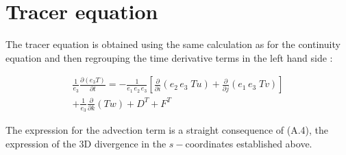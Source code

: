\documentclass[../main/NEMO_manual]{subfiles}
\begin{document}
\section{Tracer equation}
\label{sec:A_tracer}

The tracer equation is obtained using the same calculation as for the continuity equation and then
regrouping the time derivative terms in the left hand side :

\begin{multline}
  \label{apdx:A_tracer}
  \frac{1}{e_3} \frac{\partial \left(  e_3 T  \right)}{\partial t}
  = -\frac{1}{e_1 \,e_2 \,e_3}
  \left[           \frac{\partial }{\partial i} \left( {e_2 \,e_3 \;Tu} \right)
    +   \frac{\partial }{\partial j} \left( {e_1 \,e_3 \;Tv} \right)               \right]       \\
  +  \frac{1}{e_3}  \frac{\partial }{\partial k} \left(                   Tw  \right)
  +  D^{T} +F^{T}
\end{multline}

The expression for the advection term is a straight consequence of (A.4),
the expression of the 3D divergence in the $s-$coordinates established above. 

\biblio

\pindex
\end{document}
